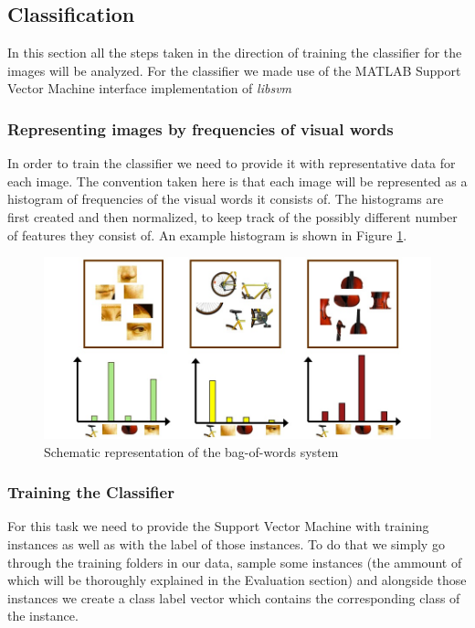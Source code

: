 \documentclass[11pt]{article}
\begin{document}
\subsection{Classification}
In this section all the steps taken in the direction of training the classifier for the images will be analyzed. For the classifier we made use of the MATLAB Support Vector Machine interface implementation of \emph{libsvm}\cite{CC01a}

\subsubsection{Representing images by frequencies of visual words}
In order to train the classifier we need to provide it with representative data for each image. The convention taken here is that each image will be represented as a histogram of frequencies of the visual words it consists of. The histograms are first created and then normalized, to keep track of the possibly different number of features they consist of. An example histogram is shown in Figure \ref{wordhistogram}.

\begin{figure}[h!]
\centering
\includegraphics[scale=0.30]{wordhistogram.jpg}
\caption{Schematic representation of the bag-of-words system}
\label{wordhistogram}
\end{figure}

\subsubsection{Training the Classifier}
For this task we need to provide the Support Vector Machine with training instances as well as with the label of those instances. To do that we simply go through the training folders in our data, sample some instances (the ammount of which will be thoroughly explained in the Evaluation section) and alongside those instances we create a class label vector which contains the corresponding class of the instance.
\end{document}
